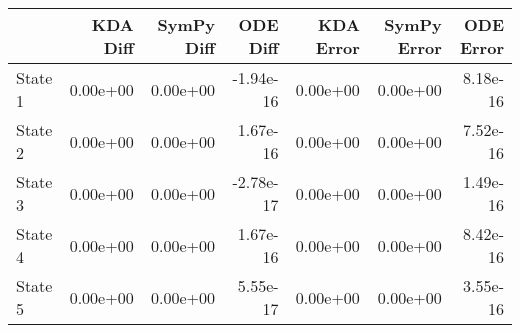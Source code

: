 \begin{tabular}{lrrrrrr}
\toprule
{} &  KDA Diff &  SymPy Diff &  ODE Diff &  KDA Error &  SymPy Error &  ODE Error \\
\midrule
State 1 &  0.00e+00 &    0.00e+00 & -1.94e-16 &   0.00e+00 &     0.00e+00 &   8.18e-16 \\
State 2 &  0.00e+00 &    0.00e+00 &  1.67e-16 &   0.00e+00 &     0.00e+00 &   7.52e-16 \\
State 3 &  0.00e+00 &    0.00e+00 & -2.78e-17 &   0.00e+00 &     0.00e+00 &   1.49e-16 \\
State 4 &  0.00e+00 &    0.00e+00 &  1.67e-16 &   0.00e+00 &     0.00e+00 &   8.42e-16 \\
State 5 &  0.00e+00 &    0.00e+00 &  5.55e-17 &   0.00e+00 &     0.00e+00 &   3.55e-16 \\
\bottomrule
\end{tabular}

